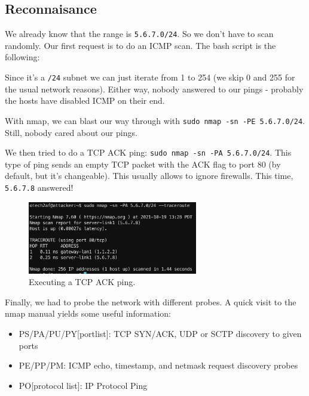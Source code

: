 \documentclass[a4paper,11pt,hidelinks]{article}
\begin{document}
\subsection{Reconnaisance}

We already know that the range is \verb=5.6.7.0/24=. So we don't have to scan randomly. Our first request is to do an ICMP scan. The bash script is the following:


Since it's a \verb=/24= subnet we can just iterate from 1 to 254 (we skip 0 and 255 for the usual network reasons). Either way, nobody answered to our pings - probably the hosts have disabled ICMP on their end.

With nmap, we can blast our way through with \verb=sudo nmap -sn -PE 5.6.7.0/24=. Still, nobody cared about our pings.

We then tried to do a TCP ACK ping: \verb=sudo nmap -sn -PA 5.6.7.0/24=. This type of ping sends an empty TCP packet with the ACK flag to port 80 (by default, but it's changeable). This usually allows to ignore firewalls. This time, \verb=5.6.7.8= answered!

\begin{figure}[h!]
  \centering
  \includegraphics[width=0.66\textwidth]{../drawable/discovery-ack-ping.png}
  \caption{Executing a TCP ACK ping.}
\end{figure}

Finally, we had to probe the network with different probes. A quick visit to the nmap manual yields some useful information:

\begin{itemize}
  \item PS/PA/PU/PY[portlist]: TCP SYN/ACK, UDP or SCTP discovery to given ports
  \item PE/PP/PM: ICMP echo, timestamp, and netmask request discovery probes
  \item PO[protocol list]: IP Protocol Ping
\end{itemize}
\end{document}
